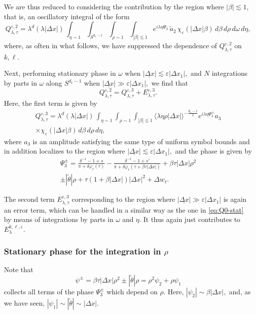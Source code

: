 \documentclass[leqno]{amsart}
\theoremstyle{definition}
\theoremstyle{remark}
\numberwithin{equation}{section}
\newcommand\la{{\lambda}}
\newcommand\ve{{\varepsilon}}
\begin{document}
We are thus reduced to considering the contribution by the  region where $|\beta|\lesssim 1$, that is, an oscillatory integral of the form
\[
Q^{\varepsilon,2}_{\lambda,\tau}=
\lambda^{d} (\la|\Delta x|)\,   \int_{\eta\sim 1} \int_{S^{d_1-1}} \int_{\rho\sim 1}  \int_{|\beta| \lesssim 1} e^{i\lambda\eta \Psi_2} \, \tilde a_2 \, \chi_\ve(\left|\Delta x\right|\beta)\, d\beta\,  d\rho\, d\omega\,d\eta,
\]
where, as often in what follows, we have suppressed the dependence of $Q^{\varepsilon,2}_{\lambda,\tau}$ on  $k,\ell$.

Next, performing stationary phase in $\omega$ when $|\underline{\Delta x}|\lesssim \ve |\Delta x_1|,$   and $N$ integrations by parts in $\omega$ along $S^{d_1-1}$ when $|\underline{\Delta x}|\gg  \ve |\Delta x_1|,$ we find that 
$$
Q^{\varepsilon,2}_{\lambda,\tau}=Q^{\varepsilon,3}_{\lambda,\tau}+E^{\varepsilon,3}_{\lambda,\tau}.
$$
Here, the first term is given by 
\begin{multline}
Q^{\varepsilon,3}_{\lambda,\tau}=
\lambda^{d} (\la|\Delta x|)\,   \int_{\eta\sim 1}  \int_{\rho\sim 1}  \int_{|\beta| \lesssim 1} 
\langle \lambda\eta \rho |\Delta x|\rangle^{-\frac{d_1-1}{2}} e^{i\lambda\eta \Psi^\pm_3}  a_3 \\
\times  \chi_\ve(\left|\Delta x\right|\beta)\, d\beta\,  d\rho\,d\eta, \label{eq:stat-rho-i}
\end{multline}
where $a_3$ is an amplitude satisfying the same type of uniform symbol bounds and in addition localizes to the region where 
$|\underline{\Delta x}|\lesssim \ve |\Delta x_1|,$ and the  phase is given by
\begin{multline*}
\Psi^\pm_3 = 
 \frac{\delta^{-1}-1 + s}{\pi + \delta \varphi_\ell(\tau)}
- \frac{ \delta^{-1}-1 + s'}{\pi + \delta \varphi_\ell\left(\tau + \beta\tau |\Delta x|\right)}
+\beta\tau \left|\Delta x\right|\rho^2 \\
\pm |\tilde \theta| \rho +\tau\left(1+ \beta|\Delta x|\right)|\Delta x|^2 + \Delta w_\ell.
\end{multline*}

The second term $E^{\varepsilon,3}_{\lambda,\tau}$  corresponding to the region where $|\underline{\Delta x}|\gg \ve |\Delta x_1|$ is again an error term, which can be handled in  a similar way as the one in \eqref{eq:Q0-stat} by means of integrations by parts in $\omega$ and $\eta$. It thus again just contributes to $E^{k,\ell,\varepsilon}_\la.$

\subsubsection{Stationary phase  for the integration in $\rho$}
Note that 
\[
\psi^\pm=\beta\tau \left|\Delta x\right|\rho^2\pm |\tilde \theta| \rho =\rho^2\psi_2+\rho \psi_1
\]
collects all terms of the phase $\Psi^\pm_3$ which depend on $\rho.$ Here, $|\psi_2|\sim \beta |\Delta x|,$ and, as we have seen,
$|\psi_1|\sim |\tilde \theta|\sim |\Delta x|.$
\end{document}
